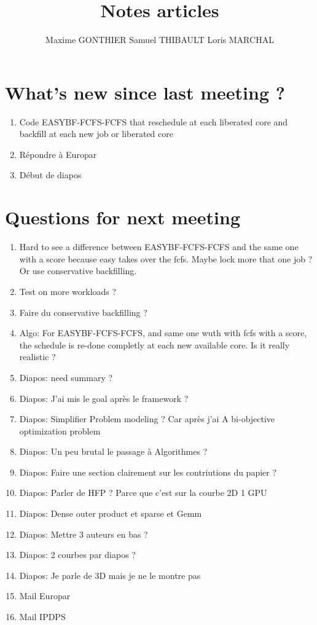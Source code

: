 \documentclass[a4paper]{article}
\title{Notes articles}
\author{Maxime GONTHIER Samuel THIBAULT Loris MARCHAL}
\begin{document}
\newpage

\section{What's new since last meeting ?}

	\begin{enumerate}
		\item Code EASYBF-FCFS-FCFS that reschedule at each liberated core and backfill at each new job or liberated core
		\item Répondre à Europar
		\item Début de diapos
	\end{enumerate}
	
\section{Questions for next meeting}

	\begin{enumerate}
		\item Hard to see a difference between EASYBF-FCFS-FCFS and the same one with a score because easy takes over the fcfs. Maybe lock more that one job ? Or use conservative backfilling.
		\item Test on more workloads ?
		\item Faire du conservative backfilling ?
		\item Algo: For EASYBF-FCFS-FCFS, and same one wuth with fcfs with a score, the schedule is re-done completly at each new available core. Is it really realistic ?
		\item Diapos: need summary ?
		\item Diapos: J'ai mis le goal après le framework ?
		\item Diapos: Simplifier Problem modeling ? Car après j'ai A bi-objective optimization problem
		\item Diapos: Un peu brutal le passage à Algorithmes ?
		\item Diapos: Faire une section clairement sur les contriutions du papier ?
		\item Diapos: Parler de HFP ? Parce que c'est sur la courbe 2D 1 GPU
		\item Diapos: Dense outer product et sparse et Gemm
		\item Diapos: Mettre 3 auteurs en bas ?
		\item Diapos: 2 courbes par diapos ?
		\item Diapos: Je parle de 3D mais je ne le montre pas
		\item Mail Europar
		\item Mail IPDPS
	\end{enumerate}
\end{document}
